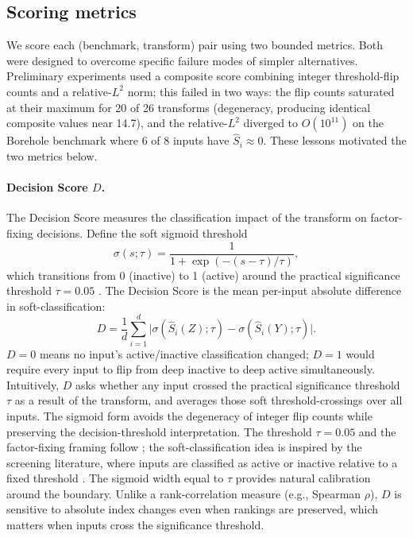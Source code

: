 \documentclass[11pt,onecolumn]{article}
\begin{document}
\subsection{Scoring metrics}
\label{sec:metrics}

We score each (benchmark, transform) pair using two bounded metrics.
Both were designed to overcome specific failure modes of simpler alternatives.
Preliminary experiments used a composite score combining integer threshold-flip
counts and a relative-$L^2$ norm; this failed in two ways: the flip counts
saturated at their maximum for 20 of 26 transforms (degeneracy, producing
identical composite values near 14.7), and the relative-$L^2$ diverged to
$O(10^{11})$ on the Borehole benchmark where 6 of 8 inputs have $\hat{S}_i \approx 0$.
These lessons motivated the two metrics below.

\paragraph{Decision Score $D$.}
The Decision Score measures the classification impact of the transform on
factor-fixing decisions. Define the soft sigmoid threshold
\begin{equation}
  \sigma(s; \tau) = \frac{1}{1 + \exp(-(s - \tau)/\tau)},
  \label{eq:soft}
\end{equation}
which transitions from 0 (inactive) to 1 (active) around the practical
significance threshold $\tau = 0.05$ \citep{Saltelli2008}.
The Decision Score is the mean per-input absolute difference in soft-classification:
\begin{equation}
  D = \frac{1}{d}\sum_{i=1}^d \bigl|\sigma(\hat{S}_i(Z); \tau) - \sigma(\hat{S}_i(Y); \tau)\bigr|.
  \label{eq:D}
\end{equation}
$D = 0$ means no input's active/inactive classification changed; $D = 1$ would
require every input to flip from deep inactive to deep active simultaneously.
Intuitively, $D$ asks whether any input crossed the practical significance
threshold $\tau$ as a result of the transform, and averages those soft
threshold-crossings over all inputs.
The sigmoid form avoids the degeneracy of integer flip counts while preserving
the decision-threshold interpretation. The threshold $\tau = 0.05$ and the
factor-fixing framing follow \citet{Saltelli2008}; the soft-classification idea
is inspired by the screening literature, where inputs are classified as active
or inactive relative to a fixed threshold \citep{Morris1991,Campolongo2007}.
The sigmoid width equal to $\tau$ provides natural calibration around the
boundary. Unlike a rank-correlation measure (e.g., Spearman $\rho$), $D$ is
sensitive to absolute index changes even when rankings are preserved, which
matters when inputs cross the significance threshold.
\end{document}
